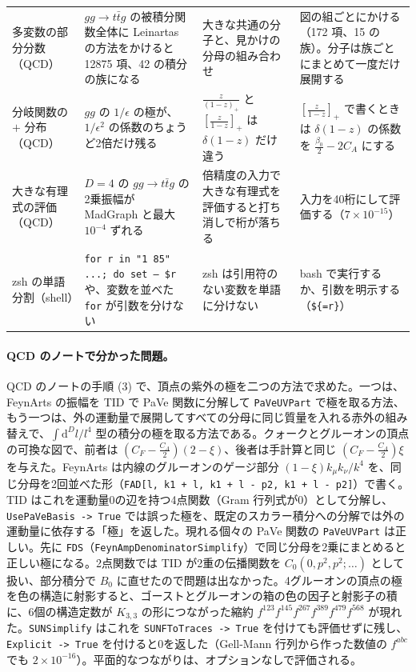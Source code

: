 \documentclass[a4paper,10pt]{ltjsarticle}
\begin{document}
\begin{table}[tbp]
\begin{tabularx}{\linewidth}{>{\raggedright\arraybackslash}p{2.4cm}>{\raggedright\arraybackslash}X>{\raggedright\arraybackslash}X>{\raggedright\arraybackslash}X}
多変数の部分分数（QCD） & $gg\to t\bar tg$ の被積分関数全体に Leinartas の方法をかけると 12875 項、42 の積分の族になる & 大きな共通の分子と、見かけの分母の組み合わせ & 図の組ごとにかける（172 項、15 の族）。分子は族ごとにまとめて一度だけ展開する \\
分岐関数の $+$ 分布（QCD） & $gg$ の $1/\epsilon$ の極が、$1/\epsilon^2$ の係数のちょうど2倍だけ残る & $\frac z{(1-z)_+}$ と $[\frac z{1-z}]_+$ は $\delta(1-z)$ だけ違う & $[\frac z{1-z}]_+$ で書くときは $\delta(1-z)$ の係数を $\frac{\beta_0}2-2C_A$ にする \\
大きな有理式の評価（QCD） & $D=4$ の $gg\to t\bar tg$ の2乗振幅が MadGraph と最大 $10^{-4}$ ずれる & 倍精度の入力で大きな有理式を評価すると打ち消しで桁が落ちる & 入力を40桁にして評価する（$7\times10^{-15}$） \\
zsh の単語分割（shell） & \texttt{for r in "1 85" ...; do set -- \$r} や、変数を並べた \texttt{for} が引数を分けない & zsh は引用符のない変数を単語に分けない & bash で実行するか、引数を明示する（\texttt{\$\{=r\}}） \\
\bottomrule
\end{tabularx}
\end{table}

\paragraph{QCD のノートで分かった問題。}QCD のノートの手順 (3) で、頂点の紫外の極を二つの方法で求めた。一つは、FeynArts の振幅を TID で PaVe 関数に分解して \texttt{PaVeUVPart} で極を取る方法、もう一つは、外の運動量で展開してすべての分母に同じ質量を入れる赤外の組み替えで、$\int\mathrm{d}^Dl/l^4$ 型の積分の極を取る方法である。クォークとグルーオンの頂点の可換な図で、前者は $(C_F-\frac{C_A}2)(2-\xi)$、後者は手計算と同じ $(C_F-\frac{C_A}2)\xi$ を与えた。FeynArts は内線のグルーオンのゲージ部分 $(1-\xi)k_\mu k_\nu/k^4$ を、同じ分母を2回並べた形（\texttt{FAD[l, k1 + l, k1 + l - p2, k1 + l - p2]}）で書く。TID はこれを運動量0の辺を持つ4点関数（Gram 行列式が0）として分解し、\texttt{UsePaVeBasis -> True} では誤った極を、既定のスカラー積分への分解では外の運動量に依存する「極」を返した。現れる個々の PaVe 関数の \texttt{PaVeUVPart} は正しい。先に \texttt{FDS}（\texttt{FeynAmpDenominatorSimplify}）で同じ分母を2乗にまとめると正しい極になる。2点関数では TID が2重の伝播関数を $C_0(0,p^2,p^2;\dots)$ として扱い、部分積分で $B_0$ に直せたので問題は出なかった。4グルーオンの頂点の極を色の構造に射影すると、ゴーストとグルーオンの箱の色の因子と射影子の積に、6個の構造定数が $K_{3,3}$ の形につながった縮約 $f^{123}f^{145}f^{267}f^{389}f^{479}f^{568}$ が現れた。\texttt{SUNSimplify} はこれを \texttt{SUNFToTraces -> True} を付けても評価せずに残し、\texttt{Explicit -> True} を付けると0を返した（Gell-Mann 行列から作った数値の $f^{abc}$ でも $2\times10^{-16}$）。平面的なつながりは、オプションなしで評価される。
\end{document}
